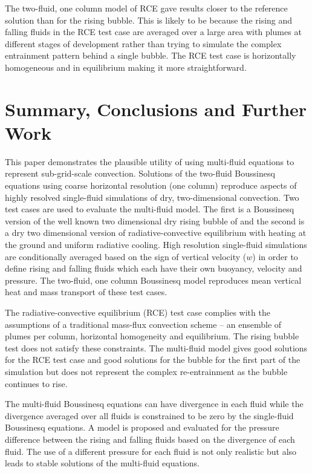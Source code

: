 \documentclass[draft]{agujournal2019}
\begin{document}
The two-fluid, one column model of RCE gave results closer to the reference solution than for the rising bubble. This is likely to be because the rising and falling fluids in the RCE test case are averaged over a large area with plumes at different stages of development rather than trying to simulate the complex entrainment pattern behind a single bubble. The RCE test case is horizontally homogeneous and in equilibrium making it more straightforward.

\section{Summary, Conclusions and Further Work \label{sec:concs}}

This paper demonstrates the plausible utility of using multi-fluid equations to represent sub-grid-scale convection.
Solutions of the two-fluid Boussinesq equations using coarse horizontal resolution (one column) reproduce aspects of highly resolved single-fluid simulations of dry, two-dimensional convection.
Two test cases are used to evaluate
the multi-fluid model. The first is a Boussinesq version of the well
known two dimensional dry rising bubble of  and the second
is a dry two dimensional version of radiative-convective equilibrium
with heating at the ground and uniform radiative cooling. High resolution
single-fluid simulations are conditionally averaged based on the sign
of vertical velocity ($w$) in order to define rising and falling fluids which each have their own  buoyancy, velocity and pressure. The two-fluid, one column Boussinesq model reproduces mean vertical heat and mass transport of these test cases. 

The radiative-convective equilibrium (RCE) test case complies with the assumptions of a traditional mass-flux convection scheme --  an ensemble of plumes per column, horizontal homogeneity and equilibrium. The rising bubble test does not satisfy these constraints. The multi-fluid model gives good solutions for the RCE test case and good solutions for the bubble for the first part of the simulation but does not represent the complex re-entrainment as the bubble continues to rise.

The multi-fluid Boussinesq equations can have divergence in each fluid
while the divergence averaged over all fluids is 
constrained to be zero by the single-fluid Boussinesq equations.
A model is proposed and evaluated for the pressure difference between the rising
and falling fluids based on the divergence of each fluid. The use
of a different pressure for each fluid is not only realistic but also
leads to stable solutions of the multi-fluid equations. 
\end{document}

